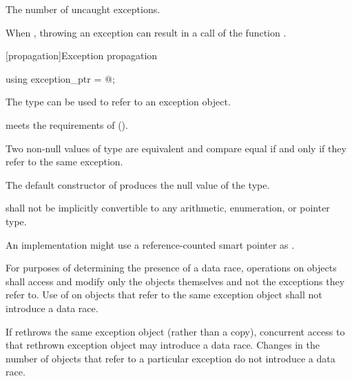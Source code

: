 \begin{itemdescr}
\pnum
\returns
The number of uncaught exceptions.

\pnum
\remarks
When ,
throwing an exception can result in a call of the function
.
\end{itemdescr}

[propagation]{Exception propagation}

%
\begin{itemdecl}
using exception_ptr = @\unspec@;
\end{itemdecl}

\begin{itemdescr}
\pnum
The type  can be used to refer to an exception object.

\pnum
{} meets the requirements of
 ().

\pnum
Two non-null values of type  are equivalent and compare equal if and
only if they refer to the same exception.

\pnum
The default constructor of  produces the null value of the
type.

\pnum
{} shall not be implicitly convertible to any arithmetic,
enumeration, or pointer type.

\pnum
\begin{note} An implementation might use a reference-counted smart
pointer as . \end{note}

\pnum
For purposes of determining the presence of a data race, operations on
 objects shall access and modify only the
 objects themselves and not the exceptions they refer to.
Use of  on  objects that refer to
the same exception object shall not introduce a data race. \begin{note} If
 rethrows the same exception object (rather than a copy),
concurrent access to that rethrown exception object may introduce a data race.
Changes in the number of  objects that refer to a
particular exception do not introduce a data race. \end{note}
\end{itemdescr}

